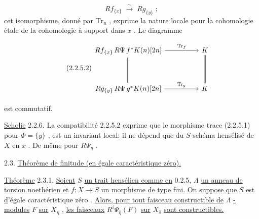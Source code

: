 \begin{equation*}
Rf_{\{x\}} \; \overset{\sim}{\longrightarrow} \; Rg_{\{y\}} \; ;
\end{equation*}
cet isomorphisme, donné par $\mathrm{Tr}_u$ , exprime la nature locale pour la cohomologie étale de la cohomologie à support dans $x$ . Le diagramme 

\begin{equation}\tag{2.2.5.2}
\begin{tikzcd}[column sep=huge, row sep=huge]
Rf_{\{x\}} \, R\Psi\, f^* K(n)[2n] \arrow[r, "\mathrm{Tr}_f"] \arrow[d, equal] & K \arrow[d, equal] \\
Rg_{\{y\}} \, R\Psi\, g^* K(n)[2n] \arrow[r, "\mathrm{Tr}_g"] & K
\end{tikzcd}
\end{equation}


 est commutatif.

\underline{Scholie} 2.2.6.  La compatibilité 2.2.5.2 exprime que le morphisme trace (2.2.5.1) pour $\Phi = \{y\}$ , est un invariant local: il ne dépend que du $S$-schéma hensélisé de $X$ en $x$ . De même pour $R\Psi_{\eta}$ .


2.3.  \underline{Théorème de finitude (en égale caractéristique zéro).}

\underline{Théorème} 2.3.1.  \underline{Soient} $S$ \underline{un trait hensélien comme en} 0.2.5, $\Lambda$ \underline{un anneau de torsion noethérien et} $f : X \to S$ \underline{un morphisme de type fini. On suppose que} $S$ \underline{est} \underline{d}'égale caractéristique zéro . \underline{Alors, pour tout faisceau constructible de} $\Lambda$ \underline{-modules} $F$ \underline{sur} $X_{\eta}$ , \underline{les faisceaux} $R^{i}\Psi_{\bar{\eta}}(F)$ \underline{sur} $X_{\bar{s}}$ \underline{sont constructibles.}

